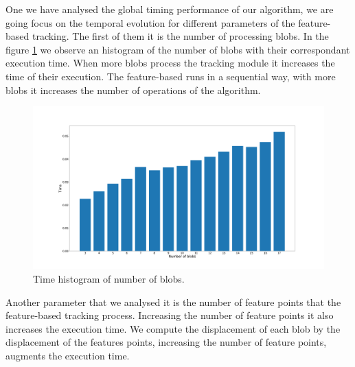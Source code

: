 %
%


One we have analysed the global timing performance of our algorithm, we are going focus on the temporal evolution for different parameters of the feature-based tracking. The first of them it is the number of processing blobs. In the figure \ref{timing3} we observe an histogram of the number of blobs with their correspondant execution time. When more blobs process the tracking module it increases the time of their execution. The feature-based runs in a sequential way, with more blobs it increases the number of operations of the algorithm. 



\begin{figure}[H]
\centering         
\includegraphics[width=14cm]{jder/histogram_blobs.png}
\caption{Time histogram of number of blobs.} \label{timing3}
\end{figure}

Another parameter that we analysed it is the number of feature points that the feature-based tracking process. Increasing the number of feature points it also increases the execution time. We compute the displacement of each blob by the displacement of the features points, increasing the number of feature points, augments the execution time. 

